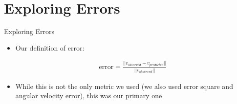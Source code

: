 \section{Exploring Errors}

\begin{frame}{Exploring Errors}
\begin{itemize}
    \item Our definition of error:

    \begin{align*}
        \mbox{error} = \frac{||v_{observed} - v_{predicted}||}{||v_{observed}||}
    \end{align*}
    \item While this is not the only metric we used (we also used error square and angular velocity error), this was our primary one

\end{itemize}  

\end{frame}

